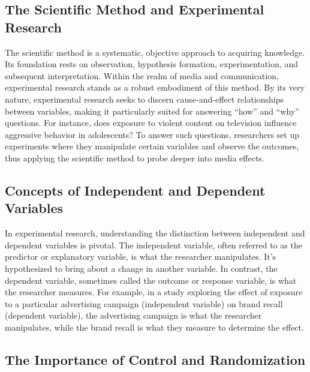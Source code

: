 \documentclass[
  b5paper]{book}
\begin{document}
\hypertarget{the-scientific-method-and-experimental-research}{%
\subsection*{The Scientific Method and Experimental Research}\label{the-scientific-method-and-experimental-research}}

The scientific method is a systematic, objective approach to acquiring knowledge. Its foundation rests on observation, hypothesis formation, experimentation, and subsequent interpretation. Within the realm of media and communication, experimental research stands as a robust embodiment of this method. By its very nature, experimental research seeks to discern cause-and-effect relationships between variables, making it particularly suited for answering ``how'' and ``why'' questions. For instance, does exposure to violent content on television influence aggressive behavior in adolescents? To answer such questions, researchers set up experiments where they manipulate certain variables and observe the outcomes, thus applying the scientific method to probe deeper into media effects.

\hypertarget{concepts-of-independent-and-dependent-variables}{%
\subsection*{Concepts of Independent and Dependent Variables}\label{concepts-of-independent-and-dependent-variables}}

In experimental research, understanding the distinction between independent and dependent variables is pivotal. The independent variable, often referred to as the predictor or explanatory variable, is what the researcher manipulates. It's hypothesized to bring about a change in another variable. In contrast, the dependent variable, sometimes called the outcome or response variable, is what the researcher measures. For example, in a study exploring the effect of exposure to a particular advertising campaign (independent variable) on brand recall (dependent variable), the advertising campaign is what the researcher manipulates, while the brand recall is what they measure to determine the effect.

\hypertarget{the-importance-of-control-and-randomization}{%
\subsection*{The Importance of Control and Randomization}\label{the-importance-of-control-and-randomization}}
\end{document}
